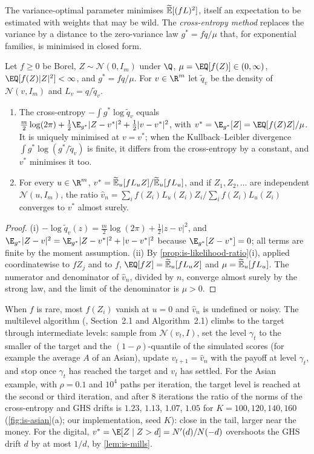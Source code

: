 The variance-optimal parameter minimises $\widetilde{\mathbb E}[(fL)^2]$, itself an expectation to be estimated
with weights that may be wild. The \emph{cross-entropy method}
\citep{rubinstein-ce,deboer-ce} replaces the variance by a distance to the zero-variance law
$g^*=fq/\mu$ that, for exponential families, is minimised in closed form.

\begin{proposition}\label{prop:is-cross-entropy}
Let $f\ge0$ be Borel, $Z\sim\mathcal N(0,I_m)$ under $\Q$, $\mu=\EQ[f(Z)]\in(0,\infty)$,
$\EQ[f(Z)|Z|^2]<\infty$, and $g^*=fq/\mu$. For $v\in\R^m$ let $\tilde q_v$ be the density of
$\mathcal N(v,I_m)$ and $L_v=q/\tilde q_v$.
\begin{enumerate}[label=(\roman*)]
  \item The cross-entropy $-\int g^*\log\tilde q_v$ equals
    $\frac m2\log(2\pi)+\frac12\E_{g^*}|Z-v^*|^2+\frac12|v-v^*|^2$, with
    $v^*=\E_{g^*}[Z]=\EQ[f(Z)Z]/\mu$. It is uniquely minimised at $v=v^*$; when the
    Kullback--Leibler divergence $\int g^*\log(g^*/\tilde q_v)$ is finite, it differs from the
    cross-entropy by a constant, and $v^*$ minimises it too.
  \item For every $u\in\R^m$, $v^*=\widetilde{\mathbb E}_u[fL_uZ]/\widetilde{\mathbb E}_u[fL_u]$, and if $Z_1,Z_2,\dots$ are
    independent $\mathcal N(u,I_m)$, the ratio
    $\hat v_n=\sum_if(Z_i)L_u(Z_i)Z_i\big/\sum_if(Z_i)L_u(Z_i)$ converges to $v^*$ almost surely.
\end{enumerate}
\end{proposition}

\begin{proof}
(i) $-\log\tilde q_v(z)=\frac m2\log(2\pi)+\frac12|z-v|^2$, and
$\E_{g^*}|Z-v|^2=\E_{g^*}|Z-v^*|^2+|v-v^*|^2$ because $\E_{g^*}[Z-v^*]=0$; all terms are
finite by the moment assumption. (ii) By \cref{prop:is-likelihood-ratio}(i), applied
coordinatewise to $fZ_j$ and to $f$, $\EQ[fZ]=\Et_u[fL_uZ]$ and $\mu=\widetilde{\mathbb E}_u[fL_u]$. The
numerator and denominator of $\hat v_n$, divided by $n$, converge almost surely by the strong
law, and the limit of the denominator is $\mu>0$.
\end{proof}

When $f$ is rare, most $f(Z_i)$ vanish at $u=0$ and $\hat v_n$ is undefined or noisy. The
multilevel algorithm (\citealp{deboer-ce}, Section~2.1 and Algorithm~2.1) climbs to the target
through intermediate levels: sample from $\mathcal N(v_t,I)$, set the level $\gamma_t$ to the
smaller of the target and the $(1-\rho)$-quantile of the simulated scores (for example the
average $A$ of an Asian), update $v_{t+1}=\hat v_n$ with the payoff at level $\gamma_t$, and
stop once $\gamma_t$ has reached the target and $v_t$ has settled. For the Asian example, with
$\rho=0.1$ and $10^4$ paths per iteration, the target level is reached at the second or third
iteration, and after $8$ iterations the ratio of the norms of the cross-entropy and GHS drifts
is $1.23$, $1.13$, $1.07$, $1.05$ for $K=100,120,140,160$ (\cref{fig:is-asian}(a); our
implementation, seed $K$): close in the tail, larger near the money. For the digital, $v^*=\E[Z\mid Z>d]=N'(d)/N(-d)$ overshoots the GHS
drift $d$ by at most $1/d$, by \cref{lem:is-mills}.

